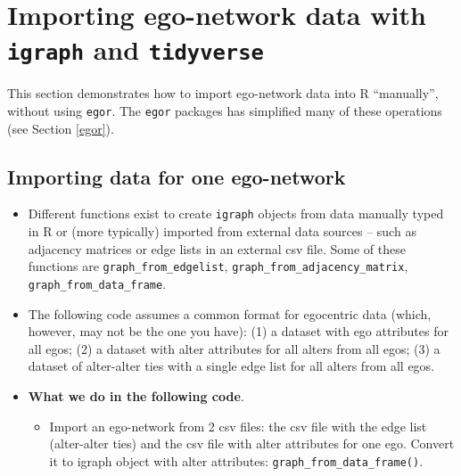 \documentclass[
]{book}
\providecommand{\tightlist}{%
  \setlength{\itemsep}{0pt}\setlength{\parskip}{0pt}}
\begin{document}
\hypertarget{import-igraph}{%
\section{\texorpdfstring{Importing ego-network data with \texttt{igraph} and \texttt{tidyverse}}{Importing ego-network data with igraph and tidyverse}}\label{import-igraph}}

This section demonstrates how to import ego-network data into R ``manually'', without using \texttt{egor}. The \texttt{egor} packages has simplified many of these operations (see Section \ref{egor}).

\hypertarget{importing-data-for-one-ego-network}{%
\subsection{Importing data for one ego-network}\label{importing-data-for-one-ego-network}}

\begin{itemize}
\tightlist
\item
  Different functions exist to create \texttt{igraph} objects from data manually typed in R or (more typically) imported from external data sources -- such as adjacency matrices or edge lists in an external csv file. Some of these functions are \texttt{graph\_from\_edgelist}, \texttt{graph\_from\_adjacency\_matrix}, \texttt{graph\_from\_data\_frame}.
\item
  The following code assumes a common format for egocentric data (which, however, may not be the one you have): (1) a dataset with ego attributes for all egos; (2) a dataset with alter attributes for all alters from all egos; (3) a dataset of alter-alter ties with a single edge list for all alters from all egos.
\item
  \textbf{What we do in the following code}.

  \begin{itemize}
  \tightlist
  \item
    Import an ego-network from 2 csv files: the csv file with the edge list (alter-alter ties) and the csv file with alter attributes for one ego. Convert it to igraph object with alter attributes: \texttt{graph\_from\_data\_frame()}.
  \end{itemize}
\end{itemize}
\end{document}
